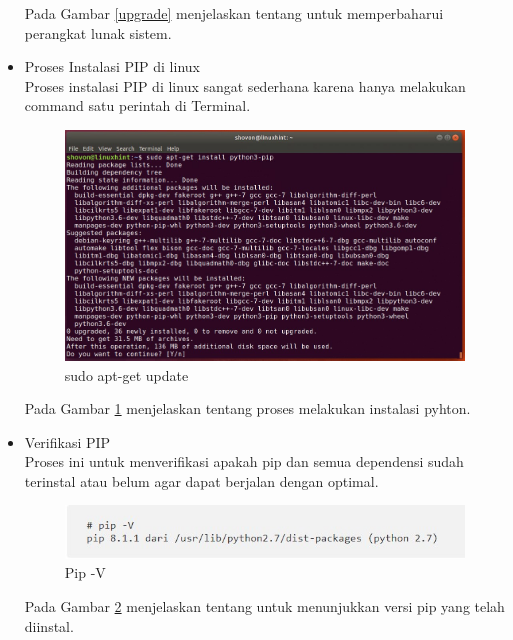 \documentclass[12pt,a4paper]{article}
\begin{document}
\begin{itemize}
Pada Gambar \ref{upgrade} menjelaskan tentang untuk memperbaharui perangkat lunak sistem.
\item Proses Instalasi PIP di linux \\
Proses instalasi PIP di linux sangat sederhana karena hanya melakukan command satu perintah di Terminal.\\
\begin{figure}[h]
\begin{center}
\includegraphics[width=1\textwidth]{../figures/1aptinstal.jpg} 
\caption{sudo apt-get update}
\label{instal}
\end{center}
\end{figure}
Pada Gambar \ref{instal} menjelaskan tentang proses melakukan instalasi pyhton.
\item Verifikasi PIP \\
Proses ini untuk menverifikasi apakah pip dan semua dependensi sudah terinstal atau belum agar dapat berjalan dengan optimal.\\
\begin{figure}[h]
\begin{center}
\includegraphics[width=1\textwidth]{../figures/1aptver.jpg} 
\caption{Pip -V}
\label{versi}
\end{center}
\end{figure}

Pada Gambar \ref{versi} menjelaskan tentang untuk menunjukkan versi pip yang telah diinstal.

\end{itemize}
\end{document}
